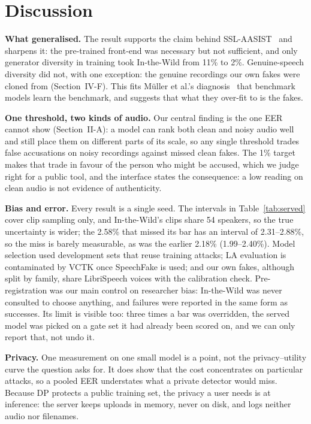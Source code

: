 \documentclass[journal]{IEEEtran}
\begin{document}
\section{Discussion}

\textbf{What generalised.} The result supports the claim behind
SSL-AASIST~\cite{tak2022ssl} and sharpens it: the pre-trained front-end was
necessary but not sufficient, and only generator diversity in training took
In-the-Wild from 11\% to 2\%. Genuine-speech diversity did not, with one
exception: the genuine recordings our own fakes were cloned from
(Section~IV-F). This fits
M\"uller et al.'s diagnosis~\cite{muller2022itw} that benchmark models learn
the benchmark, and suggests that what they over-fit to is the fakes.

\textbf{One threshold, two kinds of audio.} Our central finding is the one
EER cannot show (Section~II-A): a model can rank both clean and noisy audio
well and still place them on different parts of its scale, so any single
threshold trades false accusations on noisy recordings against missed clean
fakes. The 1\% target makes that trade in favour of the person who might be
accused, which we judge right for a public tool, and the interface states the
consequence: a low reading on clean audio is not evidence of authenticity.

\textbf{Bias and error.} Every result is a single seed. The intervals in
Table~\ref{tab:served} cover clip sampling only, and In-the-Wild's clips share
54 speakers, so the true uncertainty is wider; the 2.58\% that missed its bar
has an interval of 2.31--2.88\%, so the miss is barely measurable, as was the
earlier 2.18\% (1.99--2.40\%). Model
selection used development sets that reuse training attacks; LA evaluation is
contaminated by VCTK once SpeechFake is used; and our own fakes, although
split by family, share LibriSpeech voices with the calibration check.
Pre-registration was our main control on researcher bias: In-the-Wild was
never consulted to choose anything, and failures were reported in the same
form as successes. Its limit is visible too: three times a bar was overridden,
the served model was picked on a gate set it had already been scored on, and
we can only report that, not undo it.

\textbf{Privacy.} One measurement on one small model is a point, not the
privacy--utility curve the question asks for. It does show that the cost
concentrates on particular attacks, so a pooled EER understates what a private
detector would miss. Because DP protects a public training set, the privacy a
user needs is at inference: the server keeps uploads in memory, never on disk,
and logs neither audio nor filenames.
\end{document}
